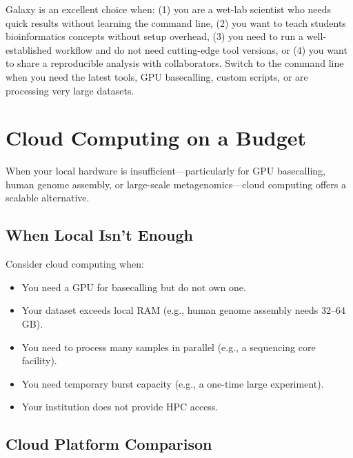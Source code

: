 \begin{tipbox}[title={When to Use Galaxy}]
Galaxy is an excellent choice when: (1) you are a wet-lab scientist who needs quick results without learning the command line, (2) you want to teach students bioinformatics concepts without setup overhead, (3) you need to run a well-established workflow and do not need cutting-edge tool versions, or (4) you want to share a reproducible analysis with collaborators. Switch to the command line when you need the latest tools, GPU basecalling, custom scripts, or are processing very large datasets.
\end{tipbox}

\section{Cloud Computing on a Budget}
\label{sec:diyanalysis:cloud}

When your local hardware is insufficient---particularly for GPU basecalling, human genome assembly, or large-scale metagenomics---cloud computing offers a scalable alternative.

\subsection{When Local Isn't Enough}
\label{subsec:diyanalysis:cloud_when}

Consider cloud computing when:
\begin{itemize}[nosep]
  \item You need a GPU for basecalling but do not own one.
  \item Your dataset exceeds local RAM (e.g., human genome assembly needs 32--64\,GB).
  \item You need to process many samples in parallel (e.g., a sequencing core facility).
  \item You need temporary burst capacity (e.g., a one-time large experiment).
  \item Your institution does not provide \acrshort{HPC} access.
\end{itemize}

\subsection{Cloud Platform Comparison}
\label{subsec:diyanalysis:cloud_comparison}


